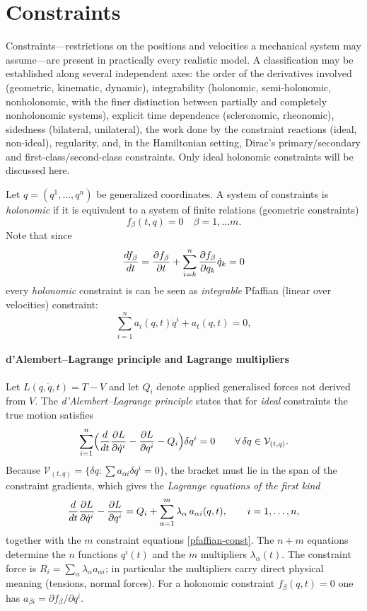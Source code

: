 \section{Constraints}
\label{sec:cm-const}
Constraints---restrictions on the positions and velocities a mechanical system may
assume---are present in practically every realistic model.   A classification may be established along several independent axes: the order of the
derivatives involved (geometric, kinematic, dynamic), integrability (holonomic,
semi-holonomic, nonholonomic, with the finer distinction between partially and completely
nonholonomic systems), explicit time dependence (scleronomic, rheonomic), sidedness
(bilateral, unilateral), the work done by the constraint reactions (ideal, non-ideal),
regularity, and, in the Hamiltonian setting, Dirac's primary/secondary and
first-class/second-class constraints.
Only ideal holonomic  constraints will be discussed here.

Let $q=(q^1,\dots,q^n)$ be generalized coordinates.
A system of constraints is \emph{holonomic} if it is
    equivalent to a system of finite
relations (geometric constraints)
\begin{equation}
   \label {holonomic-const}
   f_\beta(t,q)=0 \quad \beta =1,\dots m .
\end{equation}
 Note that since
 \[\frac{d f_\beta}{d t}=\frac{\partial f_\beta}{\partial t}+\sum_{i=k}^n\frac{\partial f_\beta}{\partial q_k} \dot q_k=0 \]
every \emph{holonomic} constraint is can be seen as \emph{integrable} 
Pfaffian (linear over velocities) constraint:
\begin{equation}
  \sum_{i=1}^n a_i(q,t) \dot q^i + a_t(q,t) = 0,
  \label{pfaffian-const}
\end{equation}

\paragraph{d'Alembert--Lagrange principle and Lagrange multipliers}
Let $L(q,\dot q,t)=T-V$ and let $Q_i$ denote applied generalised forces not derived from
$V$. The \emph{d'Alembert--Lagrange principle} states that for \emph{ideal} constraints the
true motion satisfies
\begin{equation}\label{dalembert}
  \sum_{i=1}^n\Bigl(\frac{d}{dt}\frac{\partial L}{\partial \dot q^i}-\frac{\partial L}{\partial q^i}-Q_i\Bigr)\delta q^i=0
  \qquad\forall\,\delta q\in\mathcal V_{(t,q)}.
\end{equation}
Because $\mathcal V_{(t,q)}=\{\delta q:\sum a_{\alpha i}\delta q^i=0\}$, the bracket must lie in the
span of the constraint gradients, which gives the \emph{Lagrange equations of the first kind}
\begin{equation}
    \label{lagrange-first}
  \frac{d}{dt}\frac{\partial L}{\partial \dot q^i}-\frac{\partial L}{\partial q^i}=Q_i+\sum_{\alpha=1}^m\lambda_\alpha\,a_{\alpha i}(q,t),
  \qquad i=1,\dots,n,
\end{equation}
together with the $m$ constraint equations \eqref{pfaffian-const}. The $n+m$ equations determine
the $n$ functions $q^i(t)$ and the $m$ multipliers $\lambda_\alpha(t)$. The constraint force
is $R_i=\sum_\alpha\lambda_\alpha a_{\alpha i}$; in particular the multipliers carry
direct physical meaning (tensions, normal forces). For a holonomic constraint $f_\beta(q,t)=0$
one has $a_{\beta i}=\partial f_\beta/\partial q^i$.

